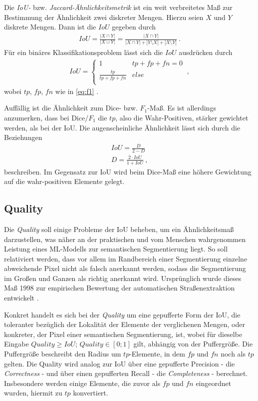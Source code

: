 Die \textit{\acf{IoU}-} bzw. \textit{Jaccard-Ähnlichkeitsmetrik} ist ein weit verbreitetes Maß zur Bestimmung der Ähnlichkeit zwei diskreter Mengen. Hierzu seien $X$ und $Y$ diskrete Mengen. Dann ist die $IoU$ gegeben durch 
\begin{align}
	\label{eq:iou} IoU = \frac{|X\cap Y|}{|X \cup Y|} = \frac{| X \cap Y |}{| X \cap Y | + |Y \setminus X| + |X \setminus Y|}~.
\end{align} 
Für ein binäres Klassifikationsproblem lässt sich die $IoU$ ausdrücken durch 
\begin{align}
	\label{eq:iou-binary} IoU = \begin{cases}
		1 & tp + fp + fn = 0 \\ 
		\frac{tp}{tp + fp + fn} & else \\
	\end{cases}~,
\end{align}
wobei $tp$, $fp$, $fn$ wie in \autoref{eq:f1} \cite{Fletcher.2018}. 

Auffällig ist die Ähnlichkeit zum Dice- bzw. $F_{1}$-Maß. Es ist allerdings anzumerken, dass bei Dice/$F_1$ die $tp$, also die Wahr-Positiven, stärker gewichtet werden, als bei der \ac{IoU}. Die augenscheinliche Ähnlichkeit lässt sich durch die Beziehungen
\begin{align}
	\label{eq:dice-iou} IoU = \frac{D}{2 - D} \\
	D = \frac{2 \cdot IoU}{1 + IoU} ~,
\end{align}
beschreiben.
Im Gegensatz zur \ac{IoU} wird beim Dice-Maß eine höhere Gewichtung auf die wahr-positiven Elemente 
gelegt.

\subsection{Quality} \label{sec:evaluation-metrics:quality}

Die \textit{Quality} soll einige Probleme der \ac{IoU} beheben, um ein Ähnlichkeitsmaß darzustellen, 
was näher an der praktischen und vom Menschen wahrgenommen Leistung eines \ac{ML}-Modells zur semantischen Segmentierung liegt.
So soll relativiert werden, dass vor allem im Randbereich einer Segmentierung einzelne abweichende Pixel
nicht als falsch anerkannt werden, sodass die Segmentierung im Großen und Ganzen als richtig anerkannt wird. 
Ursprünglich wurde dieses Maß 1998 zur empirischen Bewertung der automatischen Straßenextraktion entwickelt \cite{ChristianWiedemann.1998}. 

Konkret handelt es sich bei der \textit{Quality} um eine gepufferte Form der \ac{IoU},
die toleranter bezüglich der Lokalität der Elemente der verglichenen Mengen, oder konkreter,
der Pixel einer semantischen Segmentierung, ist, 
wobei für dieselbe Eingabe $Quality \geq IoU$; $Quality \in [0;1]$ gilt, abhängig von der Puffergröße. 
Die Puffergröße beschreibt den Radius um $tp$-Elemente, in dem $fp$ und $fn$ noch als $tp$ gelten.   
Die Quality wird analog zur \ac{IoU} über eine gepufferte Precision - die \textit{Correctness} - 
und über einen gepufferten Recall - die \textit{Completeness} - berechnet. Insbesondere werden einige Elemente, 
die zuvor als $fp$ und $fn$ eingeordnet wurden, hiermit zu $tp$ konvertiert.

